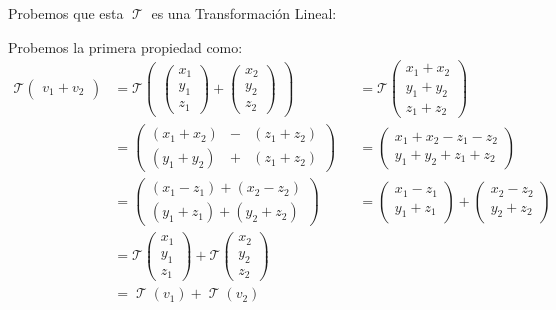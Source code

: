 \documentclass[12pt, fleqn]{report}                             %
\theoremstyle{break}                                            %
\DeclareMathOperator \LinTrans      {\mathcal{T}}               %
\newcommand{\VecLinTrans}[1]{\mathcal{T}\pVector{#1}}           %
\newcommand{\pVector}[1]                                        %
        { \ensuremath{\begin{pmatrix}#1\end{pmatrix}} }             %
\begin{document}
                    Probemos que esta $\LinTrans$ es una Transformación Lineal:

                    Probemos la primera propiedad como:
                    \begin{align*}
                        \VecLinTrans{ v_1 + v_2 }                                             
                            &= \VecLinTrans{ \pVector{x_1\\y_1\\z_1} +\pVector{x_2\\y_2\\z_2} }
                                &&= \VecLinTrans{ x_1+x_2\\y_1+y_2\\z_1+z_2 }                               \\
                            &= \pVector{ (x_1+x_2) & - & (z_1+z_2) \\ (y_1+y_2) & + & (z_1+z_2) }                       
                                &&= \pVector{ x_1+x_2-z_1-z_2 \\ y_1+y_2+z_1+z_2 }                          \\
                            &= \pVector{ (x_1-z_1)+(x_2-z_2) \\ (y_1+z_1)+(y_2+z_2) }                                   
                                &&= \pVector{ x_1-z_1\\y_1+z_1 }  + \pVector{ x_2-z_2\\y_2+z_2 }            \\
                            &= \VecLinTrans{x_1\\y_1\\z_1} +\VecLinTrans{x_2\\y_2\\z_2}                     \\
                            &= \LinTrans(v_1) + \LinTrans(v_2)
                    \end{align*}
\end{document}
